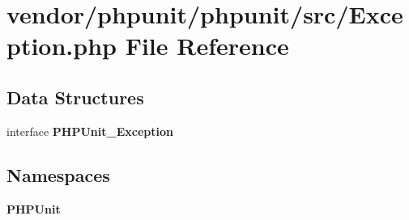 \section{vendor/phpunit/phpunit/src/\+Exception.php File Reference}
\label{phpunit_2phpunit_2src_2_exception_8php}
\subsection*{Data Structures}
\begin{DoxyCompactItemize}
\item 
interface {\bf P\+H\+P\+Unit\+\_\+\+Exception}
\end{DoxyCompactItemize}
\subsection*{Namespaces}
\begin{DoxyCompactItemize}
\item 
 {\bf P\+H\+P\+Unit}
\end{DoxyCompactItemize}
